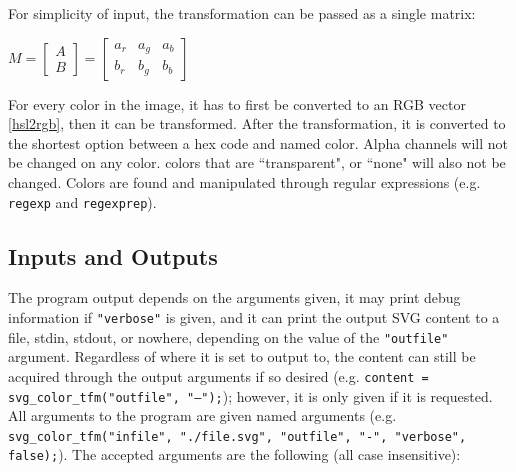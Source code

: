 \documentclass[12pt]{article}
\newcommand \iindent  {\indent \indent}
\newcommand \iiindent {\indent \iindent}
\begin{document}
\noindent For simplicity of input, the transformation can be passed as a single matrix:

$M = \begin{bmatrix}
	A \\ B
\end{bmatrix} = \begin{bmatrix}
	a_r & a_g & a_b \\
	b_r & b_g & b_b
\end{bmatrix}$

\iindent For every color in the image, it has to first be converted to an RGB vector
\ref{hsl2rgb}, then it can be transformed. After the transformation, it is converted
to the shortest option between a hex code and named color. Alpha channels will not be
changed on any color. colors that are ``transparent", or ``none" will also not be
changed. Colors are found and manipulated through regular expressions (e.g.
\textcolor{function}{\texttt{regexp}} and \textcolor{function}{\texttt{regexprep}}).

\subsection{Inputs and Outputs}

\iiindent The program output depends on the arguments given, it may print debug
information if {\tt "verbose"} is given, and it can print the output SVG content to
a file, stdin, stdout, or nowhere, depending on the value of the {\tt "outfile"}
argument. Regardless of where it is set to output to, the content can still be
acquired through the output arguments if so desired (e.g.
{\tt content = svg\_color\_tfm("outfile", "---");}); however, it is only given if
it is requested. All arguments to the program are given named arguments (e.g.
{\tt svg\_color\_tfm("infile", "./file.svg", "outfile", "-", "verbose", false);}).
The accepted arguments are the following (all case insensitive):
\end{document}
